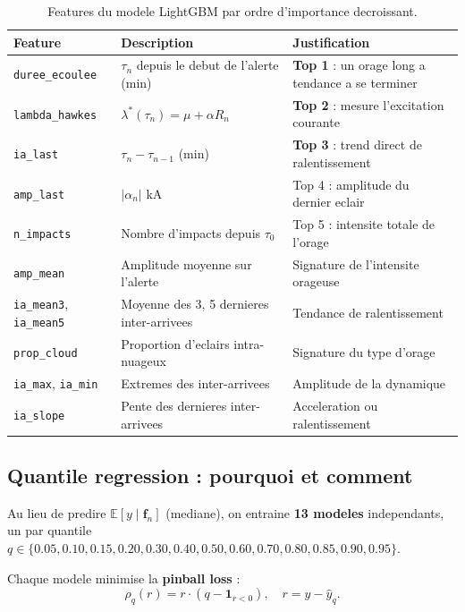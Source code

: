 \documentclass[a4paper,11pt]{article}
\begin{document}
\begin{table}[H]
\centering
\renewcommand{\arraystretch}{1.3}
\begin{tabular}{p{3.5cm} p{6cm} p{3.5cm}}
\toprule
Feature & Description & Justification \\
\midrule
\texttt{duree\_ecoulee} & $\tau_n$ depuis le debut de l'alerte (min) &
  \textbf{Top 1} : un orage long a tendance a se terminer \\
\texttt{lambda\_hawkes} & $\lambda^*(\tau_n) = \mu + \alpha R_n$ &
  \textbf{Top 2} : mesure l'excitation courante \\
\texttt{ia\_last} & $\tau_n - \tau_{n-1}$ (min) &
  \textbf{Top 3} : trend direct de ralentissement \\
\texttt{amp\_last} & $|\alpha_n|$ kA &
  Top 4 : amplitude du dernier eclair \\
\texttt{n\_impacts} & Nombre d'impacts depuis $\tau_0$ &
  Top 5 : intensite totale de l'orage \\
\texttt{amp\_mean} & Amplitude moyenne sur l'alerte &
  Signature de l'intensite orageuse \\
\texttt{ia\_mean3}, \texttt{ia\_mean5} & Moyenne des 3, 5 dernieres inter-arrivees &
  Tendance de ralentissement \\
\texttt{prop\_cloud} & Proportion d'eclairs intra-nuageux &
  Signature du type d'orage \\
\texttt{ia\_max}, \texttt{ia\_min} & Extremes des inter-arrivees &
  Amplitude de la dynamique \\
\texttt{ia\_slope} & Pente des dernieres inter-arrivees &
  Acceleration ou ralentissement \\
\bottomrule
\end{tabular}
\caption{Features du modele LightGBM par ordre d'importance decroissant.}
\label{tab:features}
\end{table}

\subsection{Quantile regression : pourquoi et comment}

Au lieu de predire $\mathbb{E}[y \mid \mathbf{f}_n]$ (mediane), on entraine
\textbf{13 modeles} independants, un par quantile
$q \in \{0.05, 0.10, 0.15, 0.20, 0.30, 0.40, 0.50, 0.60, 0.70, 0.80, 0.85,
0.90, 0.95\}$.

Chaque modele minimise la \textbf{pinball loss} :
\[
\rho_q(r) = r \cdot (q - \mathbf{1}_{r < 0}), \quad r = y - \hat{y}_q.
\]
\end{document}
